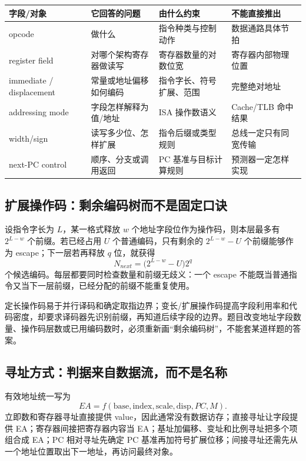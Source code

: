 \documentclass[UTF8,fontset=fandol,11pt,a4paper]{ctexart}
\begin{document}
\begin{center}\small
\begin{tabularx}{\linewidth}{L{2.3cm}L{2.6cm}L{2.8cm}Y}
\toprule
字段/对象 & 它回答的问题 & 由什么约束 & 不能直接推出 \\
\midrule
opcode & 做什么 & 指令种类与控制动作 & 数据通路具体节拍 \\
register field & 对哪个架构寄存器做读写 & 寄存器数量的对数位宽 & 寄存器内部物理位置 \\
immediate / displacement & 常量或地址偏移如何编码 & 指令字长、符号扩展、范围 & 完整绝对地址 \\
addressing mode & 字段怎样解释为值/地址 & ISA 操作数语义 & Cache/TLB 命中结果 \\
width/sign & 读写多少位、怎样扩展 & 指令后缀或类型规则 & 总线一定只有同宽传输 \\
next-PC control & 顺序、分支或调用返回 & PC 基准与目标计算规则 & 预测器一定怎样实现 \\
\bottomrule
\end{tabularx}
\end{center}

\subsection{扩展操作码：剩余编码树而不是固定口诀}

设指令字长为 $L$，某一格式释放 $w$ 个地址字段位作为操作码，则本层最多有 $2^{L-w}$ 个前缀。若已经占用 $U$ 个普通编码，只有剩余的 $2^{L-w}-U$ 个前缀能够作为 escape；下一层若再释放 $q$ 位，就获得
\[
N_{next}=\bigl(2^{L-w}-U\bigr)2^q
\]
个候选编码。每层都要同时检查数量和前缀无歧义：一个 escape 不能既当普通指令又当下一层前缀，已经分配的前缀不能重复使用。

定长操作码易于并行译码和确定取指边界；变长/扩展操作码提高字段利用率和代码密度，却要求译码器先识别前缀，再知道后续字段的边界。题目改变地址字段数量、操作码层数或已用编码数时，必须重新画“剩余编码树”，不能套某道样题的答案。

\subsection{寻址方式：判据来自数据流，而不是名称}

有效地址统一写为
\[
EA=f(\text{base},\text{index},\text{scale},\text{disp},PC,M).
\]
立即数和寄存器寻址直接提供 value，因此通常没有数据访存；直接寻址让字段提供 EA；寄存器间接把寄存器内容当 EA；基址加偏移、变址和比例寻址把多个项组合成 EA；PC 相对寻址先确定 PC 基准再加符号扩展位移；间接寻址还需先从一个地址位置取出下一地址，再访问最终对象。
\end{document}
